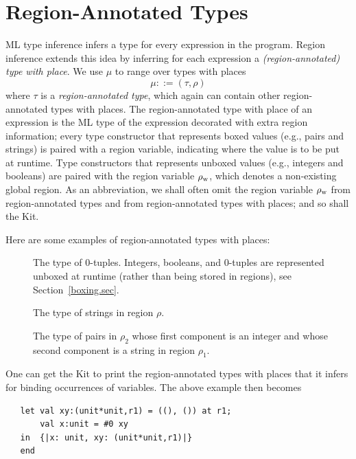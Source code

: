 \documentclass[12pt]{book}
\newcommand{\rhoword}{\rho_{\rm w}}
\begin{document}
\section{Region-Annotated Types}
\label{reganntypes.sec}
ML type inference infers a type for every expression in the program.
Region inference extends this idea by inferring for each expression a
%
%
{\em (region-annotated) type with place}. We use 
$\mu$ to range over types with places
$$\mu::=(\tau,\rho)$$
where $\tau$ is a {\em region-annotated type},
which again can contain other region-annotated types with places. The
region-annotated type with place of an expression is the ML type of
the expression decorated with extra region information; every type
constructor that represents boxed values (e.g., pairs and strings) is
paired with a region variable, indicating where the value is to be put
at runtime. Type constructors that represents unboxed values (e.g.,
integers and booleans) are paired with the region variable $\rhoword$,
which denotes a non-existing global
region.\index{$\rhoword$}
As an abbreviation, we shall often omit the region variable $\rhoword$
from region-annotated types and from region-annotated types with
places; and so shall the Kit.

Here are some examples of region-annotated types with places:
\begin{description}
\item[] The type of 0-tuples.  Integers,
  booleans, and 0-tuples are represented unboxed at
  runtime (rather than being stored in regions), see
  Section~\ref{boxing.sec}.
\item[] The type of strings in region
  $\rho$.
\item[] The type of pairs in $\rho_2$ whose first
  component is an integer and whose second component is a string in
  region $\rho_1$.
\end{description}

One can get the Kit to print the region-annotated types with places that it infers
for binding occurrences of variables. 
The above example then becomes
\begin{verbatim}
   let val xy:(unit*unit,r1) = ((), ()) at r1; 
       val x:unit = #0 xy
   in  {|x: unit, xy: (unit*unit,r1)|}
   end 
\end{verbatim}
\end{document}
